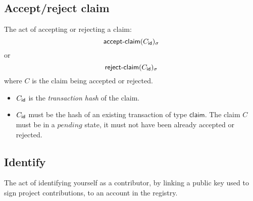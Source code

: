 \subsection{Accept/reject claim}
The act of accepting or rejecting a claim:
\[
    \mathsf{accept\hbox{-}claim}\lparen C_{\mathsf{id}}\rparen_\sigma
\]
or
\[
    \mathsf{reject\hbox{-}claim}\lparen C_{\mathsf{id}}\rparen_\sigma
\]
where $C$ is the claim being accepted or rejected.

\begin{itemize}
    \item $C_{\mathsf{id}}$ is the \emph{transaction hash} of the claim.
\end{itemize}
\validation
\begin{itemize}
    \item $C_{\mathsf{id}}$ must be the hash of an existing transaction of
        type $\mathsf{claim}$.
        The claim $C$ must be in a $pending$ state, \ie it must not have
        been already accepted or rejected.
\end{itemize}

\subsection{Identify}
The act of identifying yourself as a contributor, by linking a public key used
to sign project contributions, to an account in the registry.

